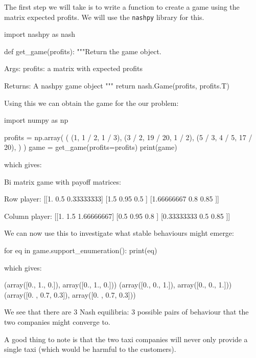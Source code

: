 The first step we will take is to write a function to create a game using the
matrix expected profits. We will use the \texttt{nashpy} library for
this.

\begin{pyin}
import nashpy as nash


def get_game(profits):
    """Return the game object.

    Args:
        profits: a matrix with expected profits

    Returns:
        A nashpy game object
    """
    return nash.Game(profits, profits.T)
\end{pyin}

Using this we can obtain the game for the our problem:

\begin{pyin}
import numpy as np

profits = np.array(
    (
        (1, 1 / 2, 1 / 3),
        (3 / 2, 19 / 20, 1 / 2),
        (5 / 3, 4 / 5, 17 / 20),
    )
)
game = get_game(profits=profits)
print(game)
\end{pyin}

which gives:

\begin{pyout}
Bi matrix game with payoff matrices:

Row player:
[[1.         0.5        0.33333333]
 [1.5        0.95       0.5       ]
 [1.66666667 0.8        0.85      ]]

Column player:
[[1.         1.5        1.66666667]
 [0.5        0.95       0.8       ]
 [0.33333333 0.5        0.85      ]]
\end{pyout}

We can now use this to investigate what stable behaviours might emerge:

\begin{pyin}
for eq in game.support_enumeration():
    print(eq)
\end{pyin}

which gives:

\begin{pyout}
(array([0., 1., 0.]), array([0., 1., 0.]))
(array([0., 0., 1.]), array([0., 0., 1.]))
(array([0. , 0.7, 0.3]), array([0. , 0.7, 0.3]))
\end{pyout}

We see that there are 3 Nash equilibria: 3 possible pairs of behaviour that the
two companies might converge to.

A good thing to note is that the two taxi
companies will never only provide a single taxi (which would be harmful to the
customers).

